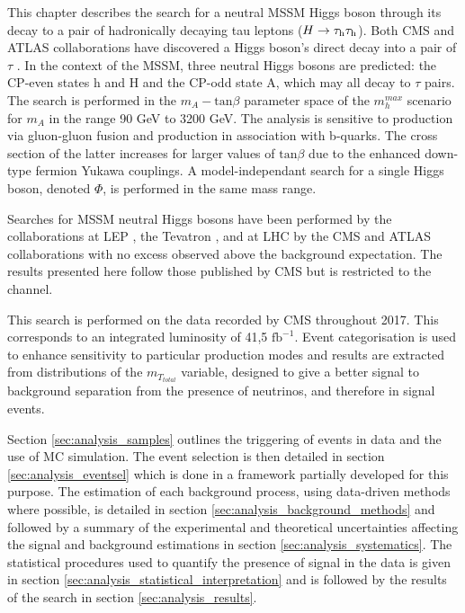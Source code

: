 This chapter describes the search for a neutral MSSM Higgs boson through its decay to a pair of hadronically decaying tau leptons ($H \rightarrow \tau_{\rm h}\tau_{\rm h}$). Both CMS and ATLAS collaborations have discovered a Higgs boson's direct decay into a pair of $\tau$ \cite{ATLASHtt,CMSHtt}. In the context of the MSSM, three neutral Higgs bosons are predicted: the CP-even states h and H and the CP-odd state A, which may all decay to $\tau$ pairs. The search is performed in the $m_A - \mathrm{tan}\beta$ parameter space of the $m_{h}^{max}$ scenario \cite{Carena2003} for $m_A$ in the range 90 GeV to 3200 GeV. The analysis is sensitive to production via gluon-gluon fusion and production in association with b-quarks. The cross section of the latter increases for larger values of $\mathrm{tan}\beta$ due to the enhanced down-type fermion Yukawa couplings. A model-independant search for a single Higgs boson, denoted $\Phi$, is performed in the same mass range.

Searches for MSSM neutral Higgs bosons have been performed by the collaborations at LEP \cite{Schael2006}, the Tevatron \cite{Benjamin:2010xb}, and at LHC by the CMS and ATLAS collaborations \cite{Aaboud2018,Sirunyan2018} with no excess observed above the background expectation. The results presented here follow those published by CMS but is restricted to the \tauh\tauh channel.

This search is performed on the data recorded by CMS throughout 2017. This corresponds to an integrated luminosity of 41,5 $\mathrm{fb^{-1}}$. Event categorisation is used to enhance sensitivity to particular production modes and results are extracted from distributions of the $m_{T_{total}}$ variable, designed to give a better signal to background separation from the presence of neutrinos, and therefore \MET in signal events.

Section \ref{sec:analysis_samples} outlines the triggering of events in data and the use of MC simulation. The event selection is then detailed in section \ref{sec:analysis_eventsel} which is done in a framework partially developed for this purpose. The estimation of each background process, using data-driven methods where possible, is detailed in section \ref{sec:analysis_background_methods} and followed by a summary of the experimental and theoretical uncertainties affecting the signal and background estimations in section \ref{sec:analysis_systematics}. The statistical procedures used to quantify the presence of signal in the data is given in section \ref{sec:analysis_statistical_interpretation} and is followed by the results of the search in section \ref{sec:analysis_results}.

